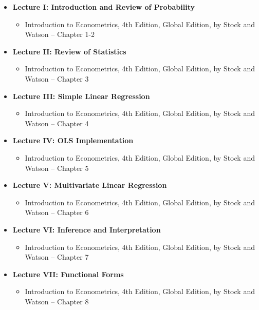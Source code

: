 \documentclass[12pt]{article}
\begin{document}
\begin{itemize}
    \item \textbf{Lecture I: Introduction and Review of Probability}
    \begin{itemize}
        \item Introduction to Econometrics, 4th Edition, Global Edition, by Stock and Watson -- Chapter 1-2

    \end{itemize}

    \item \textbf{Lecture II: Review of Statistics}
    \begin{itemize}
        \item Introduction to Econometrics, 4th Edition, Global Edition, by Stock and Watson -- Chapter 3\\[1em]
    \end{itemize}
    
    \item \textbf{Lecture III: Simple Linear Regression}
    \begin{itemize}
        \item Introduction to Econometrics, 4th Edition, Global Edition, by Stock and Watson -- Chapter 4
    \end{itemize}
    
    \item \textbf{Lecture IV: OLS Implementation}
    \begin{itemize}
        \item Introduction to Econometrics, 4th Edition, Global Edition, by Stock and Watson -- Chapter 5
    \end{itemize}
    
     \item \textbf{Lecture V: Multivariate Linear Regression}
     \begin{itemize}
        \item Introduction to Econometrics, 4th Edition, Global Edition, by Stock and Watson -- Chapter 6
    \end{itemize}
    
     \item \textbf{Lecture VI: Inference and Interpretation}
     \begin{itemize}
        \item Introduction to Econometrics, 4th Edition, Global Edition, by Stock and Watson -- Chapter 7
    \end{itemize}

    \item \textbf{Lecture VII: Functional Forms}
    \begin{itemize}
        \item Introduction to Econometrics, 4th Edition, Global Edition, by Stock and Watson -- Chapter 8
    \end{itemize}


\end{itemize}
\end{document}
